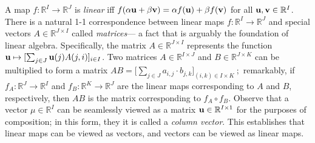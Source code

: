 A map $f : \mathbb R^I \to \mathbb R^J$ is \emph{linear} iff
$f( \alpha \mathbf u + \beta \mathbf v) = \alpha f(\mathbf u) + \beta f(\mathbf v)$ for all $\mathbf u, \mathbf v \in \mathbb R^I$. 
There is a natural
1-1 correspondence between linear maps $f : \mathbb R^I \to \mathbb R^J$ and
special vectors $A \in \mathbb R^{J \times I}$ called \emph{matrices}---%
    a fact that is arguably the foundation of linear algebra.
Specifically, the matrix $A \in \mathbb R^{J\times I}$ represents the function $\mathbf u \mapsto [ \sum_{j \in J} \mathbf u(j) A({j,i}) ]_{i \in I}$.
%
Two matrices $A \in \mathbb R^{I \times J}$ and $B \in \mathbb R^{J \times K}$
can be multiplied to form a matrix
$\displaystyle
    A B = \Big[ \sum_{j \in J} a_{i,j} \cdot b_{j,k} \Big]_{(i,k) \in I \times K}~;
$
remarkably, if $f_A : \mathbb R^{J} \to \mathbb R^{I}$ and $f_B : \mathbb R^{K} \to \mathbb R^J$ are the linear maps corresponding to $A$ and $B$, respectively, then
$A B$ is the matrix corresponding to $f_A \circ f_B$. 
Observe that a vector $\mu \in \mathbb R^I$ can be seamlessly viewed as
    a matrix $\mathbf u \in \mathbb R^{I \times 1}$ for the purposes of composition; in this form, they it is called a \emph{column vector}.
This establishes that linear maps can be viewed as vectors, 
    and vectors can be viewed as linear maps.
%



